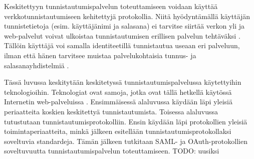 Keskitettyyn tunnistautumispalvelun toteuttamiseen voidaan käyttää verkkotunnistautumiseen kehitettyjä protokollia. Niitä hyödyntämällä käyttäjän tunnistetietoja (esim. käyttäjänimi ja salasana) ei tarvitse siirtää verkon yli ja web-palvelut voivat ulkoistaa tunnistautumisen erillisen palvelun tehtäväksi \cite{nisti}. Tällöin käyttäjä voi samalla identiteetillä tunnistautua useaan eri palveluun, ilman että hänen tarvitsee muistaa palvelukohtaisia tunnus- ja salasanayhdistelmiä \cite{open_identity}.

Tässä luvussa keskitytään keskitetyssä tunnistautumispalvelussa käytettyihin teknologioihin. Teknologiat ovat samoja, jotka ovat tällä hetkellä käytössä Internetin web-palveluissa \cite{facebook}. Ensimmäisessä alaluvussa käydään läpi yleisiä periaatteita koskien keskitettyä tunnistautumista. Toisessa alaluvussa tutustutaan tunnistautumisprotokolliin. Ensin käydään läpi protokollien yleisiä toimintaperiaatteita, minkä jälkeen esitellään tunnistautumisprotokollaksi soveltuvia standardeja. Tämän jälkeen tutkitaan SAML- ja OAuth-protokollien soveltuvuutta tunnistautumispalvelun toteuttamiseen. TODO: uusiksi